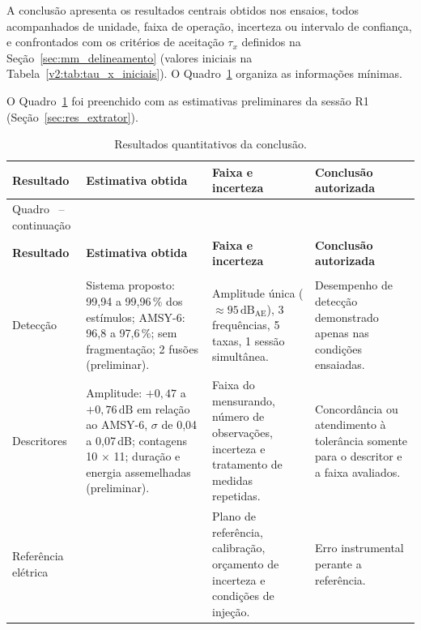A conclusão apresenta os resultados centrais obtidos nos ensaios, todos acompanhados de unidade, faixa de operação, incerteza ou intervalo de confiança, e confrontados com os critérios de aceitação \(\tau_x\) definidos na Seção~\ref{sec:mm_delineamento} (valores iniciais na Tabela~\ref{v2:tab:tau_x_iniciais}). O Quadro~\ref{v2:qua:resultados_conclusao_secao7} organiza as informações mínimas.

O Quadro~\ref{v2:qua:resultados_conclusao_secao7} foi preenchido com as estimativas preliminares da sessão R1 (Seção~\ref{sec:res_extrator}).

\begingroup
\renewcommand{\tablename}{Quadro}
\footnotesize
\renewcommand{\arraystretch}{1.22}
\begin{longtable}{|
		>{\raggedright\arraybackslash}p{3.2cm}|
		>{\raggedright\arraybackslash}p{4.0cm}|
		>{\raggedright\arraybackslash}p{3.2cm}|
		>{\raggedright\arraybackslash}p{3.8cm}|}
	\caption{Resultados quantitativos da conclusão.}
	\label{v2:qua:resultados_conclusao_secao7}\\
	\hline
	\textbf{Resultado} & \textbf{Estimativa obtida} & \textbf{Faixa e incerteza} & \textbf{Conclusão autorizada} \\
	\hline
	\endfirsthead
	\multicolumn{4}{c}
	{\tablename\ \thetable{} -- continuação}\\
	\hline
	\textbf{Resultado} & \textbf{Estimativa obtida} & \textbf{Faixa e incerteza} & \textbf{Conclusão autorizada} \\ \hline
	\endhead
	\hline
	\multicolumn{4}{r}{Continua na próxima página.}\\
	\endfoot
	\hline
	\endlastfoot
	Detecção & Sistema proposto: 99,94 a 99,96\,\% dos estímulos; AMSY-6: 96,8 a 97,6\,\%; sem fragmentação; 2 fusões (preliminar). & Amplitude única (\(\approx 95\,\mathrm{dB}_{\mathrm{AE}}\)), 3 frequências, 5 taxas, 1 sessão simultânea. & Desempenho de detecção demonstrado apenas nas condições ensaiadas. \\
	\hline
	Descritores & Amplitude: \(+0{,}47\) a \(+0{,}76\,\mathrm{dB}\) em relação ao AMSY-6, \(\sigma\) de 0,04 a 0,07\,dB; contagens 10 \(\times\) 11; duração e energia assemelhadas (preliminar). & Faixa do mensurando, número de observações, incerteza e tratamento de medidas repetidas. & Concordância ou atendimento à tolerância somente para o descritor e a faixa avaliados. \\
	\hline
	Referência elétrica & & Plano de referência, calibração, orçamento de incerteza e condições de injeção. & Erro instrumental perante a referência. \\

\end{longtable}
